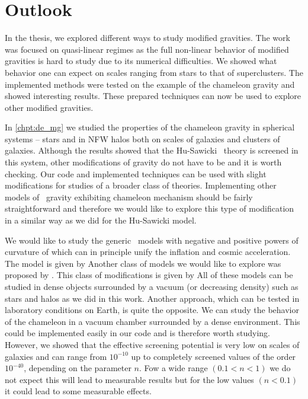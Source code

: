 \chapter{Outlook}
\label{chpt:outlook}
In the thesis, we explored different ways to study modified gravities. The work was focused on quasi-linear regimes as the full non-linear behavior of modified gravities is hard to study due to its numerical difficulties. We showed what behavior one can expect on scales ranging from stars to that of superclusters. The implemented methods were tested on the example of the chameleon gravity and showed interesting results. These prepared techniques can now be used to explore other modified gravities.

In \autoref{chpt:de_mg} we studied the properties of the chameleon gravity in spherical systems -- stars and in NFW halos both on scales of galaxies and clusters of galaxies. Although the results showed that the Hu-Sawicki \fR\ theory is screened in this system, other modifications of gravity do not have to be and it is worth checking. Our code and implemented techniques can be used with slight modifications for studies of a broader class of theories. Implementing other models of \fR\ gravity exhibiting chameleon mechanism should be fairly straightforward and therefore we would like to explore this type of modification in a similar way as we did for the Hu-Sawicki model.

We would like to study the generic \fR\ models with negative and positive powers of curvature of \textcite{2003PhRvD..68l3512N} which can in principle unify the inflation and cosmic acceleration. The model is given by
Another class of models we would like to explore was proposed by \textcite{2007JETPL..86..157S}. This class of modifications is given by
All of these models can be studied in dense objects surrounded by a vacuum (or decreasing density) such as stars and halos as we did in this work. Another approach, which can be tested in laboratory conditions on Earth, is quite the opposite. We can study the behavior of the chameleon in a vacuum chamber surrounded by a dense environment. This could be implemented easily in our code and is therefore worth studying. However, we showed that the effective screening potential is very low on scales of galaxies and can range from $10^{-10}$ up to completely screened values of the order $10^{-40}$, depending on the parameter $n$. Fow a wide range $(0.1 < n < 1)$ we do not expect this will lead to measurable results but for the low values $(n < 0.1)$ it could lead to some measurable effects.

